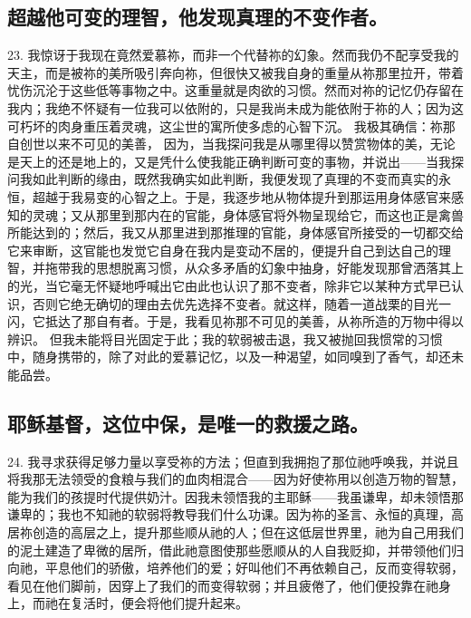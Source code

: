 
\subsection{超越他可变的理智，他发现真理的不变作者。}

23. 我惊讶于我现在竟然爱慕祢，而非一个代替祢的幻象。然而我仍不配享受我的天主，而是被祢的美所吸引奔向祢，但很快又被我自身的重量从祢那里拉开，带着忧伤沉沦于这些低等事物之中。这重量就是肉欲的习惯。然而对祢的记忆仍存留在我内；我绝不怀疑有一位我可以依附的，只是我尚未成为能依附于祢的人；因为这可朽坏的肉身重压着灵魂，这尘世的寓所使多虑的心智下沉。 我极其确信：祢那自创世以来不可见的美善， 因为，当我探问我是从哪里得以赞赏物体的美，无论是天上的还是地上的，又是凭什么使我能正确判断可变的事物，并说出——当我探问我如此判断的缘由，既然我确实如此判断，我便发现了真理的不变而真实的永恒，超越于我易变的心智之上。于是，我逐步地从物体提升到那运用身体感官来感知的灵魂；又从那里到那内在的官能，身体感官将外物呈现给它，而这也正是禽兽所能达到的；然后，我又从那里进到那推理的官能，身体感官所接受的一切都交给它来审断，这官能也发觉它自身在我内是变动不居的，便提升自己到达自己的理智，并拖带我的思想脱离习惯，从众多矛盾的幻象中抽身，好能发现那曾洒落其上的光，当它毫无怀疑地呼喊出它由此也认识了那不变者，除非它以某种方式早已认识，否则它绝无确切的理由去优先选择不变者。就这样，随着一道战栗的目光一闪，它抵达了那自有者。于是，我看见祢那不可见的美善，从祢所造的万物中得以辨识。 但我未能将目光固定于此；我的软弱被击退，我又被抛回我惯常的习惯中，随身携带的，除了对此的爱慕记忆，以及一种渴望，如同嗅到了香气，却还未能品尝。\par


\subsection{耶稣基督，这位中保，是唯一的救援之路。}

24. 我寻求获得足够力量以享受祢的方法；但直到我拥抱了那位祂呼唤我，并说且将我那无法领受的食粮与我们的血肉相混合——因为好使祢用以创造万物的智慧，能为我们的孩提时代提供奶汁。因我未领悟我的主耶稣——我虽谦卑，却未领悟那谦卑的；我也不知祂的软弱将教导我们什么功课。因为祢的圣言、永恒的真理，高居祢创造的高层之上，提升那些顺从祂的人；但在这低层世界里，祂为自己用我们的泥土建造了卑微的居所，借此祂意图使那些愿顺从的人自我贬抑，并带领他们归向祂，平息他们的骄傲，培养他们的爱；好叫他们不再依赖自己，反而变得软弱，看见在他们脚前，因穿上了我们的而变得软弱；并且疲倦了，他们便投靠在祂身上，而祂在复活时，便会将他们提升起来。\par

